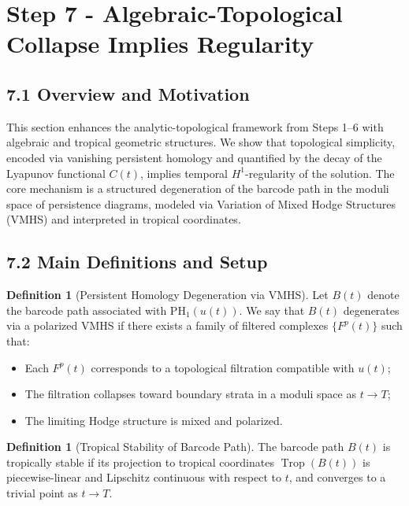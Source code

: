 \documentclass[11pt]{article}
\theoremstyle{definition}
\newtheorem{definition}[theorem]{Definition}
\begin{document}
\section{Step 7 - Algebraic-Topological Collapse Implies Regularity}

\subsection*{7.1 Overview and Motivation}

This section enhances the analytic-topological framework from Steps 1–6 with algebraic and tropical geometric structures. We show that topological simplicity, encoded via vanishing persistent homology and quantified by the decay of the Lyapunov functional $C(t)$, implies temporal $H^1$-regularity of the solution. The core mechanism is a structured degeneration of the barcode path in the moduli space of persistence diagrams, modeled via Variation of Mixed Hodge Structures (VMHS) and interpreted in tropical coordinates.

\subsection*{7.2 Main Definitions and Setup}

\begin{definition}[Persistent Homology Degeneration via VMHS]
Let $B(t)$ denote the barcode path associated with $\mathrm{PH}_1(u(t))$. We say that $B(t)$ degenerates via a polarized VMHS if there exists a family of filtered complexes $\{F^p(t)\}$ such that:
\begin{itemize}
  \item Each $F^p(t)$ corresponds to a topological filtration compatible with $u(t)$;
  \item The filtration collapses toward boundary strata in a moduli space as $t \to T$;
  \item The limiting Hodge structure is mixed and polarized.
\end{itemize}
\end{definition}

\begin{definition}[Tropical Stability of Barcode Path]
The barcode path $B(t)$ is tropically stable if its projection to tropical coordinates $\operatorname{Trop}(B(t))$ is piecewise-linear and Lipschitz continuous with respect to $t$, and converges to a trivial point as $t \to T$.
\end{definition}
\end{document}
